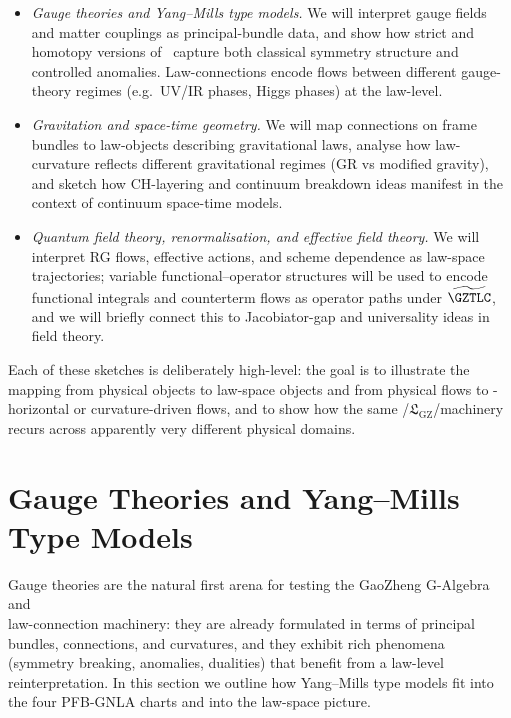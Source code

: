 \documentclass[11pt]{book}
\theoremstyle{plain}
\theoremstyle{definition}
\newcommand{\GZLS}{\ensuremath{\mathfrak{L}_{\mathrm{GZ}}}}       \newcommand{\GZLT}{\ensuremath{M_{!w}}}                           \newcommand{\GZLOC}{\ensuremath{A_M}}                             \newcommand{\GZLCurv}{\ensuremath{\mathcal{F}_{\mathrm{law}}}}
\begin{document}
\begin{itemize}
  \item \emph{Gauge theories and Yang–Mills type models.}
        We will interpret gauge fields and matter couplings as
        principal-bundle data, and show how strict and homotopy
        versions of \GAlgebra\ capture both classical symmetry
        structure and controlled anomalies. Law-connections encode
        flows between different gauge-theory regimes (e.g.\ UV/IR
        phases, Higgs phases) at the law-level.
  \item \emph{Gravitation and space-time geometry.}
        We will map connections on frame bundles to law-objects
        describing gravitational laws, analyse how law-curvature
        reflects different gravitational regimes (GR vs modified
        gravity), and sketch how CH-layering and continuum breakdown
        ideas manifest in the context of continuum space-time models.
  \item \emph{Quantum field theory, renormalisation, and effective
        field theory.}
        We will interpret RG flows, effective actions, and scheme
        dependence as law-space trajectories; variable
        functional--operator structures will be used to encode
        functional integrals and counterterm flows as operator paths
        under $\widetilde{\GZTLC}$, and we will briefly connect this
        to Jacobiator-gap and universality ideas in field theory.
\end{itemize}

Each of these sketches is deliberately high-level: the goal is to
illustrate the mapping from physical objects to law-space objects and
from physical flows to \GZTLC-horizontal or curvature-driven flows,
and to show how the same \GAlgebra/\GZLS/\GZTLC machinery recurs across
apparently very different physical domains.



\section{Gauge Theories and Yang--Mills Type Models}


Gauge theories are the natural first arena for testing the GaoZheng
G-Algebra and \\ law-connection machinery: they are already formulated in
terms of principal bundles, connections, and curvatures, and they
exhibit rich phenomena (symmetry breaking, anomalies, dualities) that
benefit from a law-level reinterpretation. In this section we outline
how Yang--Mills type models fit into the four PFB-GNLA charts and into
the law-space picture.
\end{document}
